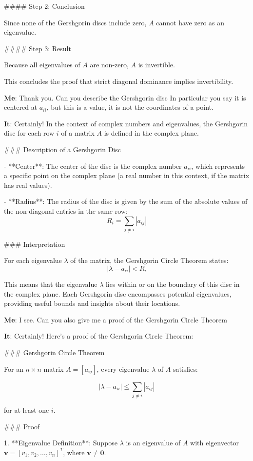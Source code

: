 \documentclass{article}
\begin{document}
#### Step 2: Conclusion

Since none of the Gershgorin discs include zero, \( A \) cannot have zero as an eigenvalue. 

#### Step 3: Result

Because all eigenvalues of \( A \) are non-zero, \( A \) is invertible.

This concludes the proof that strict diagonal dominance implies
invertibility.

{\bf Me}: Thank you. Can you describe the Gershgorin disc  In particular you
say it is centered at \(a_{ii}\), but this is a value, it is not the
coordinates of a point.

{\bf It}: Certainly! In the context of complex numbers and eigenvalues, the Gershgorin disc for each row \( i \) of a matrix \( A \) is defined in the complex plane.

### Description of a Gershgorin Disc

- **Center**: The center of the disc is the complex number \( a_{ii} \), which represents a specific point on the complex plane (a real number in this context, if the matrix has real values).

- **Radius**: The radius of the disc is given by the sum of the absolute values of the non-diagonal entries in the same row:
  \[
  R_i = \sum_{j \neq i} |a_{ij}|
  \]

### Interpretation

For each eigenvalue \( \lambda \) of the matrix, the Gershgorin Circle Theorem states:
\[
|\lambda - a_{ii}| < R_i
\]

This means that the eigenvalue \( \lambda \) lies within or on the
boundary of this disc in the complex plane. Each Gershgorin disc
encompasses potential eigenvalues, providing useful bounds and
insights about their locations.

{\bf Me}: I see.   Can you also give me a proof of the Gershgorin Circle
Theorem

{\bf It}:
Certainly! Here's a proof of the Gershgorin Circle Theorem:

### Gershgorin Circle Theorem

For an \( n \times n \) matrix \( A = [a_{ij}] \), every eigenvalue \( \lambda \) of \( A \) satisfies:

\[
|\lambda - a_{ii}| \leq \sum_{j \neq i} |a_{ij}|
\]

for at least one \( i \).

### Proof

1. **Eigenvalue Definition**:
   Suppose \( \lambda \) is an eigenvalue of \( A \) with eigenvector \( \mathbf{v} = [v_1, v_2, \ldots, v_n]^T \), where \( \mathbf{v} \neq \mathbf{0} \).
\end{document}
